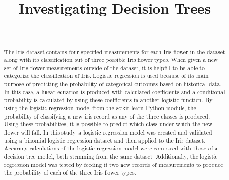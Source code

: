 \documentclass[journal]{IEEEtran}
\begin{document}
\setlength{\emergencystretch}{12pt}
\setlength{\parindent}{10pt}



\lstset{style=mystyle}

\title{Investigating Decision Trees}

\author{
\\
}

\maketitle

\begin{abstract}
\label{log:abstract}
The Iris dataset contains four specified measurements for each Iris flower in the dataset along with its classification out of three possible Iris flower types. When given a new set of Iris flower measurements outside of the dataset, it is helpful to be able to categorize the classification of Iris. Logistic regression is used because of its main purpose of predicting the probability of categorical outcomes based on historical data. In this case, a linear equation is produced with calculated coefficients and a conditional probability is calculated by using these coefficients in another logistic function. By using the logistic regression model from the scikit-learn Python module, the probability of classifying a new iris record as any of the three classes is produced. Using these probabilities, it is possible to predict which class under which the new flower will fall. In this study, a logistic regression model was created and validated using a binomial logistic regression dataset and then applied to the Iris dataset. Accuracy calculations of the logistic regression model were compared with those of a decision tree model, both stemming from the same dataset. Additionally, the logistic regression model was tested by feeding it two new records of measurements to produce the probability of each of the three Iris flower types. 
\end{abstract}
\end{document}
